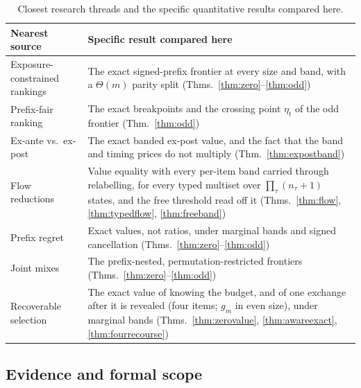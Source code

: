 \documentclass[conference]{IEEEtran}
\theoremstyle{definition}
\begin{document}
\begin{table}[h]
\caption{Closest research threads and the specific quantitative results compared here.}
\label{tab:prior}
\centering
\footnotesize
\begin{tabular}{@{}p{}p{}@{}}
\toprule
Nearest source & Specific result compared here \\
\midrule
Exposure-constrained rankings~\cite{singh2018} & The exact signed-prefix frontier at every
size and band, with a $\Theta(m)$ parity split (Thms.~\ref{thm:zero}--\ref{thm:odd}) \\
Prefix-fair ranking~\cite{celis2018} & The exact breakpoints and the crossing point
$\eta_{t}$ of the odd frontier (Thm.~\ref{thm:odd}) \\
Ex-ante vs.\ ex-post~\cite{singh2021,freeman2020} & The exact banded ex-post value, and the
fact that the band and timing prices do not multiply (Thm.~\ref{thm:expostband}) \\
Flow reductions~\cite{schrijver2003} & Value equality with every per-item band carried
through relabelling, for every typed multiset over $\prod_\tau(n_\tau+1)$ states, and the free
threshold read off it (Thms.~\ref{thm:flow}, \ref{thm:typedflow}, \ref{thm:freeband}) \\
Prefix regret~\cite{storandt2019,disser2023,bienkowski2026} & Exact values, not ratios, under
marginal bands and signed cancellation (Thms.~\ref{thm:zero}--\ref{thm:odd}) \\
Joint mixes~\cite{koike2022,bellini2016} & The prefix-nested, permutation-restricted frontiers
(Thms.~\ref{thm:zero}--\ref{thm:odd}) \\
Recoverable selection~\cite{chassein2017,hommelsheim2026} & The exact value of knowing the budget, and of one exchange after it
is revealed (four items; $g_m$ in even size), under marginal bands (Thms.~\ref{thm:zerovalue},
\ref{thm:awareexact}, \ref{thm:fourrecourse}) \\
\bottomrule
\end{tabular}
\end{table}

\subsection{Evidence and formal scope}
\end{document}

